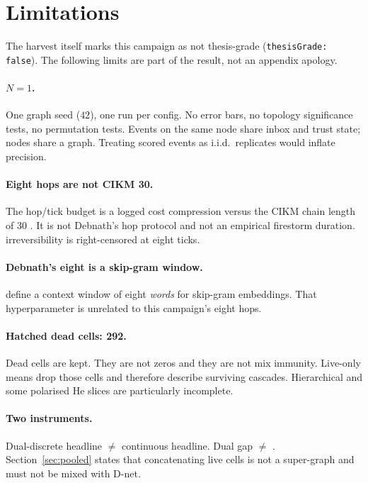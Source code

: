 \section{Limitations}
\label{sec:limits}

The harvest itself marks this campaign as not thesis-grade (\texttt{thesisGrade: false}).
The following limits are part of the result, not an appendix apology.

\paragraph{$N=1$.}
One graph seed ($42$), one run per config.
No error bars, no topology significance tests, no permutation tests.
Events on the same node share inbox and trust state; nodes share a graph.
Treating scored events as i.i.d.\ replicates would inflate precision.

\paragraph{Eight hops are not CIKM 30.}
The hop/tick budget is a logged cost compression versus the CIKM chain length of 30 \parencite{maurya2025simulating}.
It is not Debnath's hop protocol and not an empirical firestorm duration.
\kstar{} irreversibility is right-censored at eight ticks.

\paragraph{Debnath's eight is a skip-gram window.}
\textcite{debnath2023conspiracy} define a context window of eight \emph{words} for skip-gram embeddings.
That hyperparameter is unrelated to this campaign's eight hops.

\paragraph{Hatched dead cells: 292.}
Dead cells are kept.
They are not zeros and they are not mix immunity.
Live-only means drop those cells and therefore describe surviving cascades.
Hierarchical and some polarised He slices are particularly incomplete.

\paragraph{Two instruments.}
Dual-discrete headline $\neq$ continuous headline.
Dual gap $\neq$ \MPR{}.
Section~\ref{sec:pooled} states that concatenating live cells is not a super-graph and must not be mixed with D-net.

